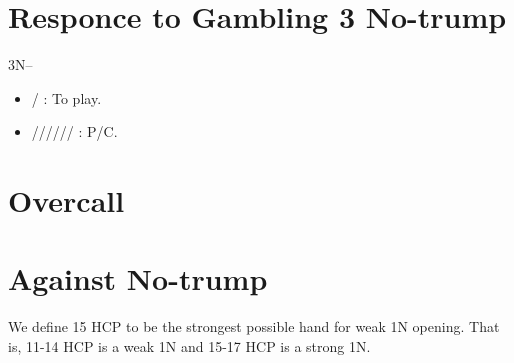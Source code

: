 \documentclass[12pt,twoside,a5paper]{report}%
\begin{document}
\chapter*{Responce to Gambling 3 No-trump}
	3N--\\
	\begin{itemize}
	\renewcommand{\labelitemi}{}
	\item {}/ : To play.
	\item {}////// : P/C.
	\end{itemize}

\chapter*{Overcall}
\chapter*{Against No-trump}
	We define 15 HCP to be the strongest possible hand for weak 1N opening. That is, 11-14 HCP is a weak 1N and 15-17 HCP is a strong 1N. 
\end{document}
